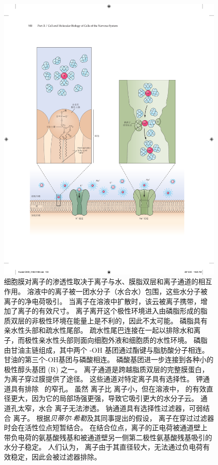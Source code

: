 \begin{figure}[htbp]
	\centering
	\includegraphics[width=0.75\linewidth]{chap08/fig_8_1}
	\caption{细胞膜对离子的渗透性取决于离子与水、膜脂双层和离子通道的相互作用。
		溶液中的离子被一团水分子（水合水）包围，这些水分子被离子的净电荷吸引。
		当离子在溶液中扩散时，该云被离子携带，增加了离子的有效尺寸。
		离子离开这个极性环境进入由磷脂形成的脂质双层的非极性环境在能量上是不利的，因此不太可能。
		磷脂具有亲水性头部和疏水性尾部。
		疏水性尾巴连接在一起以排除水和离子，而极性亲水性头部则面向细胞外液和细胞质的水性环境。
		磷脂由甘油主链组成，其中两个 -OH 基团通过酯键与脂肪酸分子相连。
		甘油的第三个-OH基团与磷酸相连。
		磷酸基团进一步连接到各种小的极性醇头基团 (R) 之一。
		离子通道是跨越脂质双层的完整膜蛋白，为离子穿过膜提供了途径。
		这些通道对特定离子具有选择性。
		钾通道具有排除~ 的窄孔。
		虽然  离子比  离子小，但在溶液中， 的有效直径更大，因为它的局部场强更强，导致它吸引更大的水分子云。
		 通道孔太窄，水合  离子无法渗透。
		钠通道具有选择性过滤器，可弱结合  离子。
		根据\textit{贝蒂尔$\cdot$希勒}及其同事提出的假设， 离子在穿过过滤器时会在活性位点短暂结合。
		在结合位点，离子的正电荷被通道壁上带负电荷的氨基酸残基和被通道壁另一侧第二极性氨基酸残基吸引的水分子稳定。
		人们认为， 离子由于其直径较大，无法通过负电荷有效稳定，因此会被过滤器排除。}
	\label{fig:8_1}
\end{figure}


